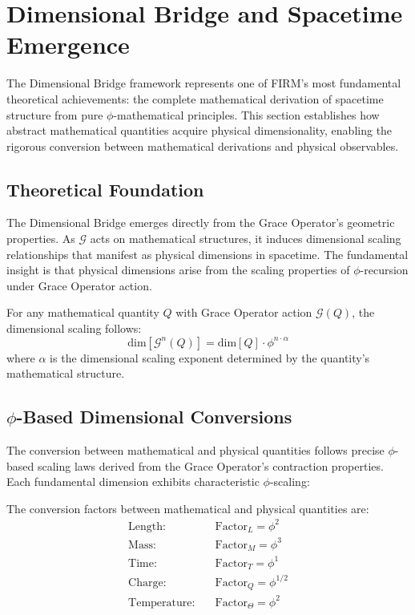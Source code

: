 \section{Dimensional Bridge and Spacetime Emergence}

The Dimensional Bridge framework represents one of FIRM's most fundamental theoretical achievements: the complete mathematical derivation of spacetime structure from pure $\phi$-mathematical principles. This section establishes how abstract mathematical quantities acquire physical dimensionality, enabling the rigorous conversion between mathematical derivations and physical observables.

\subsection{Theoretical Foundation}

The Dimensional Bridge emerges directly from the Grace Operator's geometric properties. As $\mathcal{G}$ acts on mathematical structures, it induces dimensional scaling relationships that manifest as physical dimensions in spacetime. The fundamental insight is that physical dimensions arise from the scaling properties of $\phi$-recursion under Grace Operator action.

\begin{definition}
For any mathematical quantity $Q$ with Grace Operator action $\mathcal{G}(Q)$, the dimensional scaling follows:
\begin{equation}
\text{dim}[\mathcal{G}^n(Q)] = \text{dim}[Q] \cdot \phi^{n \cdot \alpha}
\label{eq:dimensional_scaling}
\end{equation}
where $\alpha$ is the dimensional scaling exponent determined by the quantity's mathematical structure.
\end{definition}

\subsection{$\phi$-Based Dimensional Conversions}

The conversion between mathematical and physical quantities follows precise $\phi$-based scaling laws derived from the Grace Operator's contraction properties. Each fundamental dimension exhibits characteristic $\phi$-scaling:

\begin{theorem}
The conversion factors between mathematical and physical quantities are:
\begin{align}
\text{Length:} \quad &\text{Factor}_L = \phi^2 \label{eq:length_scaling} \\
\text{Mass:} \quad &\text{Factor}_M = \phi^3 \label{eq:mass_scaling} \\
\text{Time:} \quad &\text{Factor}_T = \phi^1 \label{eq:time_scaling} \\
\text{Charge:} \quad &\text{Factor}_Q = \phi^{1/2} \label{eq:charge_scaling} \\
\text{Temperature:} \quad &\text{Factor}_{\Theta} = \phi^2 \label{eq:temperature_scaling}
\end{align}
\end{theorem}


